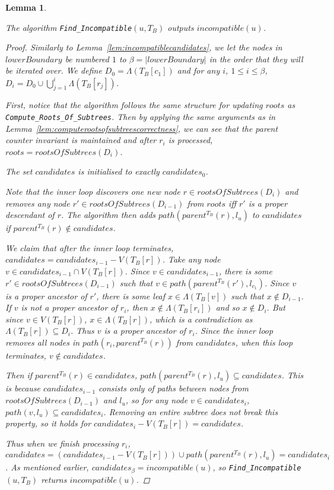 \documentclass{article}
\newcommand{\leafset}{\Lambda}
\newtheorem{findincompatiblecorrectness}[incompatibility]{Lemma}
\begin{document}
    \bigskip
    \begin{findincompatiblecorrectness}
        \label{lem:findincompatiblecorrectness}

        The algorithm \texttt{Find\_Incompatible}$(u, T_B)$ outputs $incompatible(u)$.

        \begin{proof}
            Similarly to Lemma~\ref{lem:incompatiblecandidates}, we let the nodes in $lowerBoundary$ be numbered $1$ to $\beta = |lowerBoundary|$ in the order that they will be iterated over. We define $D_0 = \leafset(T_B[c_1])$ and for any $i$, $1 \leq i \leq \beta$, $D_i = D_0 \cup \bigcup_{j = 1}^{i} \leafset(T_B[r_j])$.

            First, notice that the algorithm follows the same structure for updating $roots$ as \texttt{Compute\_Roots\_Of\_Subtrees}. Then by applying the same arguments as in Lemma~\ref{lem:computerootsofsubtreescorrectness}, we can see that the parent counter invariant is maintained and after $r_i$ is processed, $roots = rootsOfSubtrees(D_i)$.

            The set $candidates$ is initialised to exactly $candidates_0$.

            Note that the inner loop discovers one new node $r \in rootsOfSubtrees(D_i)$ and removes any node $r' \in rootsOfSubtrees(D_{i-1})$ from $roots$ iff $r'$ is a proper descendant of $r$. The algorithm then adds $path(parent^{T_B}(r), l_u)$ to $candidates$ if $parent^{T_B}(r) \not\in candidates$.

            We claim that after the inner loop terminates, $candidates = candidates_{i-1} - V(T_B[r])$. Take any node $v \in candidates_{i-1} \cap V(T_B[r])$. Since $v \in candidates_{i-1}$, there is some $r' \in rootsOfSubtrees(D_{i-1})$ such that $v \in path(parent^{T_B}(r'), l_{c_1})$. Since $v$ is a proper ancestor of $r'$, there is some leaf $x \in \leafset(T_B[v])$ such that $x \not\in D_{i-1}$. If $v$ is not a proper ancestor of $r_i$, then $x \not\in \leafset(T_B[r_i])$ and so $x \not\in D_i$. But since $v \in V(T_B[r])$, $x \in \leafset(T_B[r])$, which is a contradiction as $\leafset(T_B[r]) \subseteq D_i$. Thus $v$ is a proper ancestor of $r_i$. Since the inner loop removes all nodes in $path(r_i, parent^{T_B}(r))$ from $candidates$, when this loop terminates, $v \not\in candidates$.

            Then if $parent^{T_B}(r) \in candidates$, $path(parent^{T_B}(r), l_u) \subseteq candidates$. This is because $candidates_{i-1}$ consists only of paths between nodes from $rootsOfSubtrees(D_{i-1})$ and $l_u$, so for any node $v \in candidates_i$, $path(v, l_u) \subseteq candidates_i$. Removing an entire subtree does not break this property, so it holds for $candidates_i - V(T_B[r]) = candidates$.

            Thus when we finish processing $r_i$, $candidates = (candidates_{i-1} - V(T_B[r])) \cup path(parent^{T_B}(r), l_u) = candidates_i$. As mentioned earlier, $candidates_{\beta} = incompatible(u)$, so \texttt{Find\_Incompatible}$(u, T_B)$ returns $incompatible(u)$.
        \end{proof}
    \end{findincompatiblecorrectness}
\end{document}
